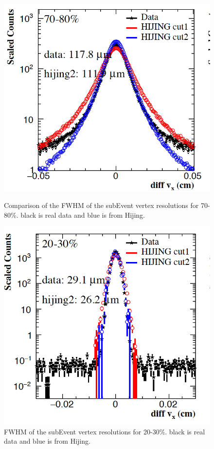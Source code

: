 \begin{figure}[htbp]
\begin{minipage}[htbp]{0.47\linewidth}
\centering
\includegraphics[width=1.0\textwidth,angle=0]{figure/Run14_D0HFT/vtxX_70_80_2.png}
\caption{ Comparison of the FWHM of the subEvent vertex resolutions for 70-80\%. black is real data and blue is from Hijing. \label{vtxX_70_80}}
\end{minipage}
\hfill
\begin{minipage}[htbp]{0.47\linewidth}
\centering
\includegraphics[width=1.0\textwidth,angle=0]{figure/Run14_D0HFT/vtxX_20_30_2.png} 
\caption{ FWHM of the subEvent vertex resolutions for 20-30\%. black is real data and blue is from Hijing.\label{vtxX_20_30}}
\end{minipage}
\end{figure}

